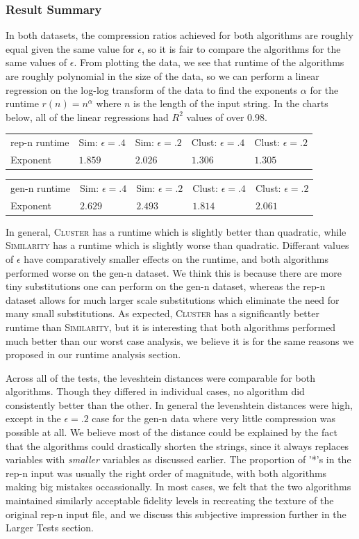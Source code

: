 \documentclass[11pt]{article}
\newcommand{\Similarity}{\textsc{Similarity}\xspace}
\newcommand{\Cluster}{\textsc{Cluster}\xspace}
\begin{document}
\subsubsection{Result Summary}

In both datasets, the 
compression ratios achieved for both algorithms are roughly equal given the
same value for $\epsilon$, so it is fair to compare the algorithms for the same
values of $\epsilon$. 
From plotting the data, we see that runtime of the algorithms are roughly
polynomial in the size of the data, so we can perform a linear regression on
the log-log transform of the data to find the exponents $\alpha$ for the
runtime $r(n)=n^\alpha$ where $n$ is the length of the input string. In the
charts below, all of the linear regressions had $R^2$ values of over $0.98$.

\begin{tabular}{l|l|l|l|l}
rep-n runtime & Sim: $\epsilon=.4$ & Sim: $\epsilon=.2$ & Clust: $\epsilon = .4$ & Clust: $\epsilon = .2$ \\
Exponent      & $1.859$ & $2.026$ & $1.306$ & $1.305$
\end{tabular}

\begin{tabular}{l|l|l|l|l}
gen-n runtime & Sim: $\epsilon=.4$ & Sim: $\epsilon=.2$ & Clust: $\epsilon = .4$ & Clust: $\epsilon = .2$ \\
Exponent      & $2.629$ & $2.493$ & $1.814$ & $2.061$
\end{tabular}

In general, \Cluster has a runtime which is slightly better than quadratic,
while \Similarity has a runtime which is slightly worse than quadratic.
Differant values of $\epsilon$ have comparatively smaller effects on the
runtime, and both algorithms performed worse on the gen-n dataset. We think
this is because there are more tiny substitutions one can perform on
the gen-n dataset, whereas the rep-n dataset allows for much larger scale
substitutions which eliminate the need for many small substitutions.
As expected, \Cluster has a significantly better runtime than \Similarity,
but it is interesting that both algorithms performed much better than our
worst case analysis, we believe it is for the same reasons we proposed
in our runtime analysis section.


Across all of the tests, the leveshtein
distances were comparable for both algorithms. Though they differed in
individual cases, no algorithm did consistently better than the other.
In general the levenshtein distances were high, except in the $\epsilon=.2$
case for the gen-n data where very little compression was possible at all.
We believe most of the distance could be explained by
the fact that the algorithms could drastically shorten
the strings, since it always replaces variables with \emph{smaller} variables
as discussed earlier.
The proportion of '*'s in the rep-n input
was usually the right order of magnitude, with both algorithms making big
mistakes occassionally. In most cases, we felt that the two algorithms maintained similarly
acceptable fidelity levels in recreating the texture of the original rep-n
input file, and we discuss this subjective impression further in the
Larger Tests section.
\end{document}
